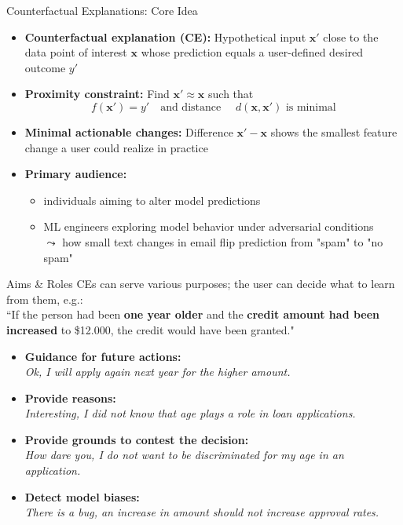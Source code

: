 \documentclass[11pt,compress,t,notes=noshow, aspectratio=169, xcolor=table, usenames,dvipsnames]{beamer}
\begin{document}
\begin{frame}{Counterfactual Explanations: Core Idea}
  \begin{itemize}
    \item<1-> \textbf{Counterfactual explanation (CE):} Hypothetical input \(\mathbf{x}'\) close to the data point of interest $\mathbf{x}$ whose prediction equals a user-defined desired outcome \(y'\)
    \item<2-> \textbf{Proximity constraint:} Find \(\mathbf{x}' \approx \mathbf{x}\) such that
      \[
        f(\mathbf{x}') = y' \quad\text{and distance }\quad 
        d(\mathbf{x},\mathbf{x}') \text{ is minimal}
      \]
    \item<3-> \textbf{Minimal actionable changes:} Difference \(\mathbf{x}'-\mathbf{x}\) shows the smallest feature change a user could realize in practice
    \item<4-> \textbf{Primary audience:} 
    \begin{itemize}
        \item individuals aiming to alter model predictions 
        \item ML engineers exploring model behavior under adversarial conditions\\
        $\leadsto$ how small text changes in email flip  prediction from "spam" to "no spam"
    \end{itemize}
  \end{itemize}
\end{frame}


\begin{frame}{Aims \& Roles}
	CEs can serve various purposes; the user can decide what to learn from them, e.g.:  \\[0.2cm]
	``If the person had been \textbf{one year older} and the \textbf{credit amount had been increased} to \$12.000, the credit would have been granted."  \\[0.2cm]
	\pause
	\begin{itemize}[<+->]
		\itemsep1.2em
		\item \textbf{Guidance for future actions:}\\ \textit{Ok, I will apply again next year for the higher amount.}
		\item \textbf{Provide reasons:}\\ \textit{Interesting, I did not know that age plays a role in loan applications.}
		\item \textbf{Provide grounds to contest the decision:}\\ \textit{How dare you, I do not want to be discriminated for my age in an application.}
		\item \textbf{Detect model biases:}\\ \textit{There is a bug, an increase in amount should not increase approval rates.}
	\end{itemize}
\end{frame}
\end{document}
